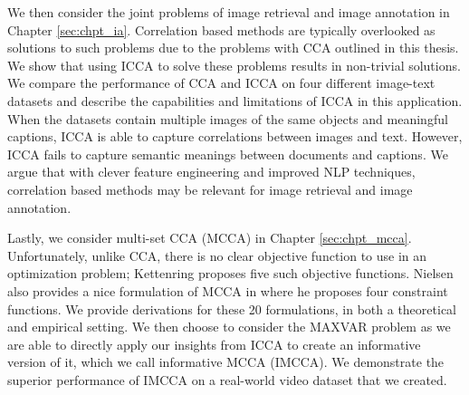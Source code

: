 We then consider the joint problems of image retrieval and image annotation in Chapter
\ref{sec:chpt_ia}. Correlation based methods are typically overlooked as solutions to such
problems due to the problems with CCA outlined in this thesis. We show that using ICCA to
solve these problems results in non-trivial solutions. We compare the performance of CCA
and ICCA on four different image-text datasets and describe the capabilities and
limitations of ICCA in this application. When the datasets contain multiple images of the
same objects and meaningful captions, ICCA is able to capture correlations between images
and text. However, ICCA fails to capture semantic meanings between documents and
captions. We argue that with clever feature engineering and improved NLP techniques,
correlation based methods may be relevant for image retrieval and image annotation.

Lastly, we consider multi-set CCA (MCCA) in Chapter \ref{sec:chpt_mcca}. Unfortunately,
unlike CCA, there is no clear objective function to use in an optimization problem;
Kettenring \cite{kettenring1971canonical} proposes five such objective functions. Nielsen
also provides a nice formulation of MCCA in \cite{nielsen1994analysis} where he proposes
four constraint functions.  We provide derivations for these 20 formulations, in both a
theoretical and empirical setting. We then choose to consider the MAXVAR problem as we are
able to directly apply our insights from ICCA to create an informative version of it,
which we call informative MCCA (IMCCA). We demonstrate the superior performance of IMCCA
on a real-world video dataset that we created. 

